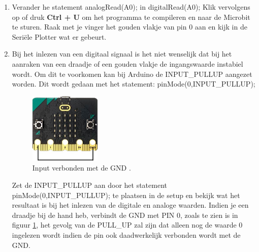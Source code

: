 \begin{enumerate}
	
	\item Verander he statement  \textcolor{arduinoOrange}{analogRead}(A0); in \textcolor{arduinoOrange}{digitalRead}(A0); Klik vervolgens op  of druk \colorbox{mygray}{\textbf{Ctrl + U}} om het programma te compileren en naar de Microbit te sturen. Raak met je vinger het gouden vlakje van pin 0 aan en kijk in de Seriële Plotter wat er gebeurt. 
	
	\item Bij het inlezen van een digitaal signaal is het niet wenselijk dat bij het aanraken van een draadje of een gouden vlakje de ingangswaarde instabiel wordt. Om dit te voorkomen kan bij Arduino de  \textcolor{arduinoBlue}{INPUT\_PULLUP} aangezet worden. Dit wordt gedaan met het statement: \textcolor{arduinoOrange}{pinMode}(0,\textcolor{arduinoBlue}{INPUT\_PULLUP}); 
	
	\begin{minipage}{\linewidth}
		\begin{figure}
			\vspace{-15pt}
			\begin{center}
				\centering
				\captionsetup{justification=centering}
				\includegraphics[width=0.32\textwidth]{figuren/microBitDraad}
			\end{center}
			\caption{Input verbonden met de GND .}
			\label{fig:micrDraad}
		\end{figure}
		Zet de \textcolor{arduinoBlue}{INPUT\_PULLUP} aan door het statement 
		\textcolor{arduinoOrange}{pinMode}(0,\textcolor{arduinoBlue}{INPUT\_PULLUP});  
		te plaatsen in de \textcolor{arduinoGreen}{setup} en bekijk wat het resultaat is bij het inlezen van de digitale en analoge waarden. Indien je een draadje bij de hand heb, verbindt de GND met PIN 0, zoals te zien is in figuur \ref{fig:micrDraad}, het gevolg van de PULL\_UP zal zijn dat alleen nog de waarde 0 ingelezen wordt indien de pin ook daadwerkelijk verbonden wordt met de GND.
	\end{minipage}
	
\end{enumerate}

